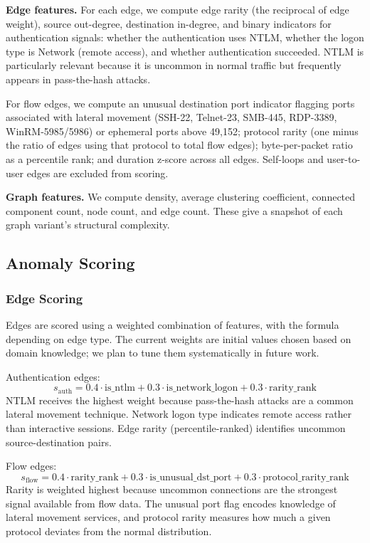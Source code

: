 \textbf{Edge features.}
For each edge, we compute edge rarity (the reciprocal of edge weight), source out-degree, destination in-degree, and binary indicators for authentication signals: whether the authentication uses NTLM, whether the logon type is Network (remote access), and whether authentication succeeded. NTLM is particularly relevant because it is uncommon in normal traffic but frequently appears in pass-the-hash attacks.

For flow edges, we compute an unusual destination port indicator flagging ports associated with lateral movement (SSH-22, Telnet-23, SMB-445, RDP-3389, WinRM-5985/5986) or ephemeral ports above 49,152; protocol rarity (one minus the ratio of edges using that protocol to total flow edges); byte-per-packet ratio as a percentile rank; and duration z-score across all edges. Self-loops and user-to-user edges are excluded from scoring.

\textbf{Graph features.}
We compute density, average clustering coefficient, connected component count, node count, and edge count. These give a snapshot of each graph variant's structural complexity.

\subsection{Anomaly Scoring}

\subsubsection{Edge Scoring}
Edges are scored using a weighted combination of features, with the formula depending on edge type. The current weights are initial values chosen based on domain knowledge; we plan to tune them systematically in future work.

Authentication edges:
\begin{equation}
s_{\text{auth}} = 0.4 \cdot \text{is\_ntlm} + 0.3 \cdot \text{is\_network\_logon} + 0.3 \cdot \text{rarity\_rank}
\end{equation}
NTLM receives the highest weight because pass-the-hash attacks are a common lateral movement technique. Network logon type indicates remote access rather than interactive sessions. Edge rarity (percentile-ranked) identifies uncommon source-destination pairs.

Flow edges:
\begin{equation}
s_{\text{flow}} = 0.4 \cdot \text{rarity\_rank} + 0.3 \cdot \text{is\_unusual\_dst\_port} + 0.3 \cdot \text{protocol\_rarity\_rank}
\end{equation}
Rarity is weighted highest because uncommon connections are the strongest signal available from flow data. The unusual port flag encodes knowledge of lateral movement services, and protocol rarity measures how much a given protocol deviates from the normal distribution.

